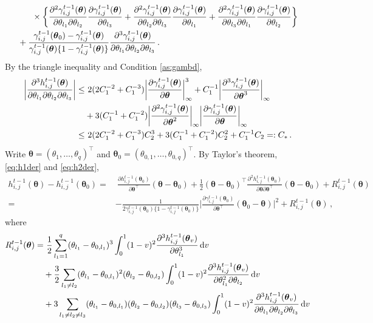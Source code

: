 \documentclass[12pt]{article}
\newcommand{\btheta}{\boldsymbol \theta}
\def\T{{\scriptscriptstyle \top} }
\newcommand{\0}{{\bf 0}}
\begin{document}
\begin{align}
&~~~~~\times\bigg\{\frac{\partial^2\gamma_{i,j}^{t-1}(\btheta)}{\partial\theta_{l_1}\partial\theta_{l_2}}\frac{\partial\gamma_{i,j}^{t-1}(\btheta)}{\partial\theta_{l_3}}+\frac{\partial^2\gamma_{i,j}^{t-1}(\btheta)}{\partial\theta_{l_2}\partial\theta_{l_3}}\frac{\partial\gamma_{i,j}^{t-1}(\btheta)}{\partial\theta_{l_1}}+\frac{\partial^2\gamma_{i,j}^{t-1}(\btheta)}{\partial\theta_{l_3}\partial\theta_{l_1}}\frac{\partial\gamma_{i,j}^{t-1}(\btheta)}{\partial\theta_{l_2}}\bigg\}\notag\\
&+\frac{\gamma_{i,j}^{t-1}(\btheta_0)-\gamma_{i,j}^{t-1}(\btheta)}{\gamma_{i,j}^{t-1}(\btheta)\{1-\gamma_{i,j}^{t-1}(\btheta)\}}\frac{\partial^3\gamma_{i,j}^{t-1}(\btheta)}{\partial\theta_{l_1}\partial\theta_{l_2}\partial\theta_{l_3}}\,.\notag
\end{align}
By the triangle inequality and Condition \ref{as:gambd},
\begin{align}\label{eq:h3bd}
\bigg|\frac{\partial^3h_{i,j}^{t-1}(\btheta)}{\partial\theta_{l_1}\partial\theta_{l_2}\partial\theta_{l_3}}\bigg|\leq&~2(2C_1^{-2}+C_1^{-3})\bigg|\frac{\partial\gamma_{i,j}^{t-1}(\btheta)}{\partial\btheta}\bigg|_\infty^3+C_1^{-1}\bigg|\frac{\partial^3\gamma_{i,j}^{t-1}(\btheta)}{\partial\btheta^3}\bigg|_\infty\notag\\
&+3(C_1^{-1}+C_1^{-2})\bigg|\frac{\partial^2\gamma_{i,j}^{t-1}(\btheta)}{\partial\btheta^2}\bigg|_\infty\bigg|\frac{\partial\gamma_{i,j}^{t-1}(\btheta)}{\partial\btheta}\bigg|_\infty\\
\leq&~2(2C_1^{-2}+C_1^{-3})C_2^3+3(C_1^{-1}+C_1^{-2})C_2^2+C_1^{-1}C_2=:C_*\,.\notag
\end{align}
Write $\btheta=(\theta_1,\ldots,\theta_q)^{\T}$ and $\btheta_0=(\theta_{0,1},\ldots,\theta_{0,q})^{\T}$. By Taylor's theorem, \eqref{eq:h1der} and \eqref{eq:h2der}, %
\begin{align*}
h_{i,j}^{t-1}(\btheta)-h_{i,j}^{t-1}(\btheta_0)=&~\frac{\partial h_{i,j}^{t-1}(\btheta_0)}{\partial\btheta^{\T}}(\btheta-\btheta_0)+\frac{1}{2}(\btheta-\btheta_0)^{\T}\frac{\partial^2h_{i,j}^{t-1}(\btheta_0)}{\partial\btheta\partial\btheta^{\T}}(\btheta-\btheta_0)+R_{i,j}^{t-1}(\btheta)\\
=&-\frac{1}{2\gamma_{i,j}^{t-1}(\btheta_0)\{1-\gamma_{i,j}^{t-1}(\btheta_0)\}}\bigg|\frac{\partial\gamma_{i,j}^{t-1}(\btheta_0)}{\partial\btheta^{\T}}(\btheta_0-\btheta)\bigg|^2+R_{i,j}^{t-1}(\btheta)\,,
\end{align*}
where 
\begin{align*}
R_{i,j}^{t-1}(\btheta)=&~\frac{1}{2}\sum_{l_1=1}^q(\theta_{l_1}-\theta_{0,l_1})^3\int_0^1(1-v)^2\frac{\partial^3h_{i,j}^{t-1}(\btheta_v)}{\partial\theta_{l_1}^3}\,{\rm d}v\\
&+\frac{3}{2}\sum_{l_1\neq l_2}(\theta_{l_1}-\theta_{0,l_1})^2(\theta_{l_2}-\theta_{0,l_2})\int_0^1(1-v)^2\frac{\partial^3h_{i,j}^{t-1}(\btheta_v)}{\partial\theta_{l_1}^2\partial\theta_{l_2}}\,{\rm d}v\\
&+3\sum_{l_1\neq l_2\neq l_3}(\theta_{l_1}-\theta_{0,l_1})(\theta_{l_2}-\theta_{0,l_2})(\theta_{l_3}-\theta_{0,l_3})\int_0^1(1-v)^2\frac{\partial^3h_{i,j}^{t-1}(\btheta_v)}{\partial\theta_{l_1}\partial\theta_{l_2}\partial\theta_{l_3}}\,{\rm d}v
\end{align*}
\end{document}
